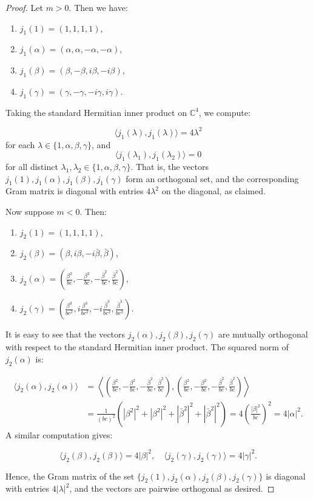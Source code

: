 \documentclass[table]{amsart}
\numberwithin{equation}{section}
\begin{document}
\begin{proof}
\par Let $m > 0$. Then we have:
\begin{enumerate}
\item $j_1(1) = (1,1,1,1)$,
\item $j_1(\alpha) = (\alpha, \alpha, -\alpha, -\alpha)$,
\item $j_1(\beta) = (\beta, -\beta, i\beta, -i\beta)$,
\item $j_1(\gamma) = (\gamma, -\gamma, -i\gamma, i\gamma)$.
\end{enumerate}
Taking the standard Hermitian inner product on $\mathbb{C}^4$, we compute:

$$
\langle j_1(\lambda), j_1(\lambda) \rangle = 4\lambda^2
$$
\noindent for each $\lambda \in \{1, \alpha, \beta, \gamma\}$, and
$$
\langle j_1(\lambda_1), j_1(\lambda_2) \rangle = 0
$$
\noindent for all distinct $\lambda_1, \lambda_2 \in \{1, \alpha, \beta, \gamma\}$. That is, the vectors $j_1(1), j_1(\alpha), j_1(\beta), j_1(\gamma)$ form an orthogonal set, and the corresponding Gram matrix is diagonal with entries $4\lambda^2$ on the diagonal, as claimed.

\medskip

Now suppose $m < 0$. Then:
\begin{enumerate}
\item $j_2(1) = (1, 1, 1, 1)$,
\item $j_2(\beta) = (\beta, i\beta, -i\bar{\beta}, \bar{\beta})$,
\item $j_2(\alpha) = \left( \frac{\beta^2}{bc}, -\frac{\beta^2}{bc}, -\frac{\bar{\beta}^2}{bc}, \frac{\bar{\beta}^2}{bc} \right)$,
\item $j_2(\gamma) = \left( \frac{\beta^3}{bc^2}, i\frac{\beta^3}{bc^2}, -i\frac{\bar{\beta}^3}{bc^2}, \frac{\bar{\beta}^3}{bc^2} \right)$.
\end{enumerate}
\noindent It is easy to see that the vectors $j_2(\alpha), j_2(\beta), j_2(\gamma)$ are mutually orthogonal with respect to the standard Hermitian inner product. The squared norm of $j_2(\alpha)$ is:

$$
\begin{aligned}
\langle j_2(\alpha), j_2(\alpha) \rangle 
&= \left\langle \left( \frac{\beta^2}{bc}, -\frac{\beta^2}{bc}, -\frac{\bar{\beta}^2}{bc}, \frac{\bar{\beta}^2}{bc} \right), \left( \frac{\beta^2}{bc}, -\frac{\beta^2}{bc}, -\frac{\bar{\beta}^2}{bc}, \frac{\bar{\beta}^2}{bc} \right) \right\rangle \\
&= \frac{1}{(bc)^2} \left( |\beta^2|^2 + |\beta^2|^2 + |\bar{\beta}^2|^2 + |\bar{\beta}^2|^2 \right) = 4 \left( \frac{|\beta|^2}{bc} \right)^2 = 4|\alpha|^2.
\end{aligned}
$$
\noindent A similar computation gives:

$$
\langle j_2(\beta), j_2(\beta) \rangle = 4|\beta|^2, \quad \langle j_2(\gamma), j_2(\gamma) \rangle = 4|\gamma|^2.
$$

Hence, the Gram matrix of the set $\{j_2(1), j_2(\alpha), j_2(\beta), j_2(\gamma)\}$ is diagonal with entries $4|\lambda|^2$, and the vectors are pairwise orthogonal as desired.

\end{proof}
\end{document}
